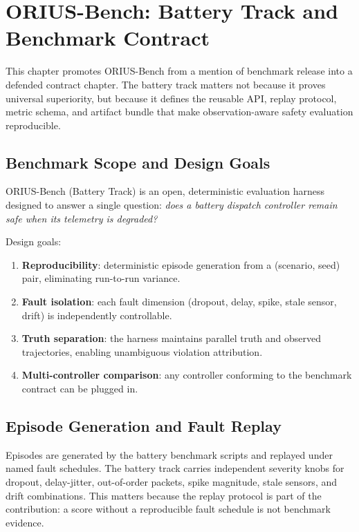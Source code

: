\chapter{ORIUS-Bench: Battery Track and Benchmark Contract}
\label{ch:orius-bench-battery}

This chapter promotes ORIUS-Bench from a mention of benchmark release into a
defended contract chapter.  The battery track matters not because it proves
universal superiority, but because it defines the reusable API, replay
protocol, metric schema, and artifact bundle that make observation-aware
safety evaluation reproducible.

\section{Benchmark Scope and Design Goals}

ORIUS-Bench (Battery Track) is an open, deterministic evaluation harness
designed to answer a single question: \emph{does a battery dispatch
controller remain safe when its telemetry is degraded?}

Design goals:
\begin{enumerate}
  \item \textbf{Reproducibility}: deterministic episode generation from a
    (scenario, seed) pair, eliminating run-to-run variance.
  \item \textbf{Fault isolation}: each fault dimension (dropout, delay,
    spike, stale sensor, drift) is independently controllable.
  \item \textbf{Truth separation}: the harness maintains parallel truth
    and observed trajectories, enabling unambiguous violation attribution.
  \item \textbf{Multi-controller comparison}: any controller conforming
    to the benchmark contract can be plugged in.
\end{enumerate}

\section{Episode Generation and Fault Replay}

Episodes are generated by the battery benchmark scripts and replayed under
named fault schedules.  The battery track carries independent severity knobs
for dropout, delay-jitter, out-of-order packets, spike magnitude, stale
sensors, and drift combinations.  This matters because the replay protocol is
part of the contribution: a score without a reproducible fault schedule is
not benchmark evidence.

